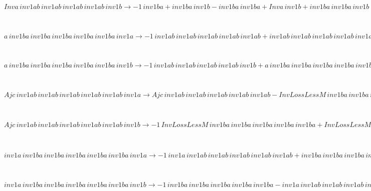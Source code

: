 \begin{minipage}{6in}
$
Inva\,
 inv1ab\,
 inv1ab\,
 inv1ab\,
 inv1ab\,
 inv1b\rightarrow -1\,
 inv1ba + inv1ba\,
 inv1b - inv1ba\,
 inv1ba + Inva\,
 inv1b + inv1ba\,
 inv1ba\,
 inv1b - inv1ba\,
 inv1ba\,
 inv1ba + inv1ba\,
 inv1ba\,
 inv1ba\,
 inv1b - inv1ba\,
 inv1ba\,
 inv1ba\,
 inv1ba + inv1ba\,
 inv1ba\,
 inv1ba\,
 inv1ba\,
 inv1b
$
\end{minipage}\medskip \\
\begin{minipage}{6in}
$
a\,
 inv1ba\,
 inv1ba\,
 inv1ba\,
 inv1ba\,
 inv1ba\,
 inv1a\rightarrow -1\,
 inv1ab\,
 inv1ab\,
 inv1ab\,
 inv1ab\,
 inv1ab + inv1ab\,
 inv1ab\,
 inv1ab\,
 inv1ab\,
 inv1ab\,
 inv1a
$
\end{minipage}\medskip \\
\begin{minipage}{6in}
$
a\,
 inv1ba\,
 inv1ba\,
 inv1ba\,
 inv1ba\,
 inv1ba\,
 inv1b\rightarrow -1\,
 inv1ab\,
 inv1ab\,
 inv1ab\,
 inv1ab\,
 inv1b + a\,
 inv1ba\,
 inv1ba\,
 inv1ba\,
 inv1ba\,
 inv1ba + inv1ab\,
 inv1ab\,
 inv1ab\,
 inv1ab\,
 inv1ab\,
 inv1b
$
\end{minipage}\medskip \\
\begin{minipage}{6in}
$
Ajc\,
 inv1ab\,
 inv1ab\,
 inv1ab\,
 inv1ab\,
 inv1ab\,
 inv1a\rightarrow Ajc\,
 inv1ab\,
 inv1ab\,
 inv1ab\,
 inv1ab\,
 inv1ab - InvLossLessM\,
 inv1ba\,
 inv1ba\,
 inv1ba\,
 inv1ba\,
 inv1a + InvLossLessM\,
 inv1ba\,
 inv1ba\,
 inv1ba\,
 inv1ba\,
 inv1ba\,
 inv1a
$
\end{minipage}\medskip \\
\begin{minipage}{6in}
$
Ajc\,
 inv1ab\,
 inv1ab\,
 inv1ab\,
 inv1ab\,
 inv1ab\,
 inv1b\rightarrow -1\,
 InvLossLessM\,
 inv1ba\,
 inv1ba\,
 inv1ba\,
 inv1ba\,
 inv1ba + InvLossLessM\,
 inv1ba\,
 inv1ba\,
 inv1ba\,
 inv1ba\,
 inv1ba\,
 inv1b
$
\end{minipage}\medskip \\
\begin{minipage}{6in}
$
inv1a\,
 inv1ba\,
 inv1ba\,
 inv1ba\,
 inv1ba\,
 inv1ba\,
 inv1a\rightarrow -1\,
 inv1a\,
 inv1ab\,
 inv1ab\,
 inv1ab\,
 inv1ab\,
 inv1ab + inv1ba\,
 inv1ba\,
 inv1ba\,
 inv1ba\,
 inv1ba\,
 inv1a + inv1a\,
 inv1ab\,
 inv1ab\,
 inv1ab\,
 inv1ab\,
 inv1ab\,
 inv1a
$
\end{minipage}\medskip \\
\begin{minipage}{6in}
$
inv1a\,
 inv1ba\,
 inv1ba\,
 inv1ba\,
 inv1ba\,
 inv1ba\,
 inv1b\rightarrow -1\,
 inv1ba\,
 inv1ba\,
 inv1ba\,
 inv1ba\,
 inv1ba - inv1a\,
 inv1ab\,
 inv1ab\,
 inv1ab\,
 inv1ab\,
 inv1b + inv1a\,
 inv1ba\,
 inv1ba\,
 inv1ba\,
 inv1ba\,
 inv1ba + inv1ba\,
 inv1ba\,
 inv1ba\,
 inv1ba\,
 inv1ba\,
 inv1b + inv1a\,
 inv1ab\,
 inv1ab\,
 inv1ab\,
 inv1ab\,
 inv1ab\,
 inv1b
$
\end{minipage}\medskip \\
